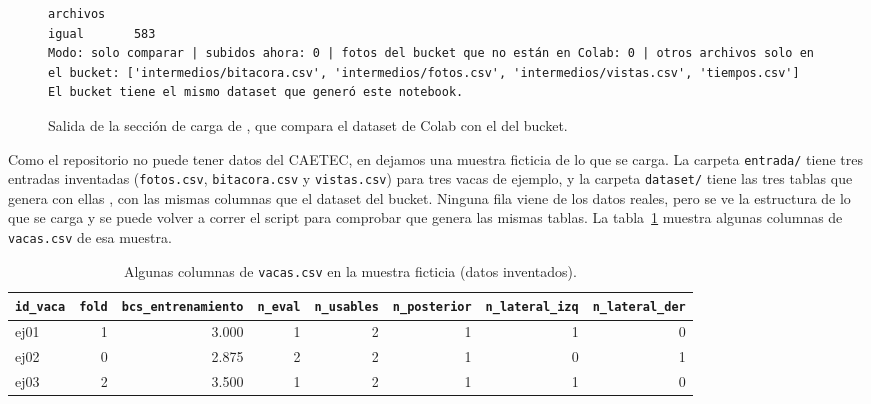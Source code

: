 \documentclass[11pt,letterpaper,DIV=12]{scrartcl}
\begin{document}
\begin{figure}[H]
  \centering
\begin{Verbatim}[frame=single, fontsize=\small, breaklines=true]
        archivos
igual       583
Modo: solo comparar | subidos ahora: 0 | fotos del bucket que no están en Colab: 0 | otros archivos solo en el bucket: ['intermedios/bitacora.csv', 'intermedios/fotos.csv', 'intermedios/vistas.csv', 'tiempos.csv']
El bucket tiene el mismo dataset que generó este notebook.
\end{Verbatim}
  \caption{Salida de la sección de carga de , que compara el dataset de Colab con el del bucket.}
  \label{fig:carga}
\end{figure}

Como el repositorio no puede tener datos del CAETEC, en  dejamos una muestra ficticia de lo que se carga. La carpeta \nolinkurl{entrada/} tiene tres entradas inventadas (\nolinkurl{fotos.csv}, \nolinkurl{bitacora.csv} y \nolinkurl{vistas.csv}) para tres vacas de ejemplo, y la carpeta \nolinkurl{dataset/} tiene las tres tablas que genera con ellas , con las mismas columnas que el dataset del bucket. Ninguna fila viene de los datos reales, pero se ve la estructura de lo que se carga y se puede volver a correr el script para comprobar que genera las mismas tablas. La tabla~\ref{tab:muestra} muestra algunas columnas de \nolinkurl{vacas.csv} de esa muestra.

\begin{table}[H]
  \centering
  \small
  \caption{Algunas columnas de \nolinkurl{vacas.csv} en la muestra ficticia (datos inventados).}
  \label{tab:muestra}
  \footnotesize
  \setlength{\tabcolsep}{4pt}
  \begin{tabular}{lrrrrrrr}
    \toprule
    \nolinkurl{id_vaca} & \nolinkurl{fold} & \nolinkurl{bcs_entrenamiento} & \nolinkurl{n_eval} & \nolinkurl{n_usables} & \nolinkurl{n_posterior} & \nolinkurl{n_lateral_izq} & \nolinkurl{n_lateral_der} \\
    \midrule
    ej01 & 1 & 3.000 & 1 & 2 & 1 & 1 & 0 \\
    ej02 & 0 & 2.875 & 2 & 2 & 1 & 0 & 1 \\
    ej03 & 2 & 3.500 & 1 & 2 & 1 & 1 & 0 \\
    \bottomrule
  \end{tabular}
\end{table}
\end{document}
